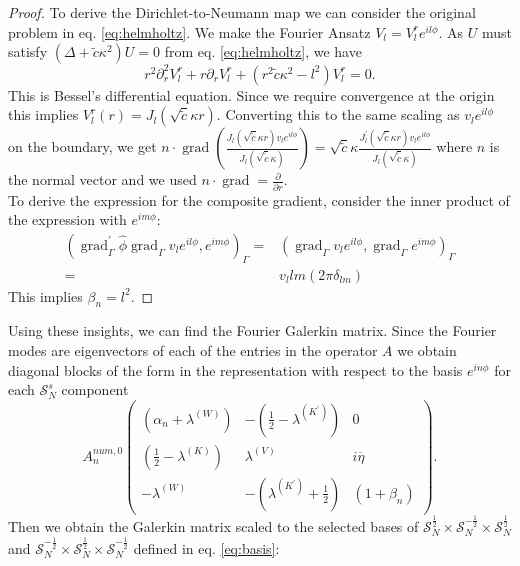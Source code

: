 \documentclass[12pt,journal,compsoc, onecolumn]{IEEEtran}
\begin{document}
\begin{proof}
    To derive the Dirichlet-to-Neumann map we can consider the original problem in eq. \ref{eq:helmholtz}. 
    We make the Fourier Ansatz $V_l = V^r_l e^{i l \phi}$. As $U$ must satisfy  $(\Delta + \tilde c\kappa^2) U = 0$ from eq. \ref{eq:helmholtz}, 
we have 
$$
r^2 \partial_r^2V_l^r + r \partial_r V_l^r + (r^2  \tilde c \kappa^2 - l^2)V^r_l = 0.
$$
This is Bessel's differential equation. Since we require convergence at the origin this implies $V^r_l(r) = J_l(\sqrt{\tilde c}\kappa r)$. Converting this to the same scaling as $v_le^{il\phi}$ on the boundary, we get $n\cdot \operatorname{grad} \left(\frac{J_l(\sqrt{\tilde c}\kappa r) v_l e^{i l \phi}}{J_l(\sqrt{\tilde c}\kappa)}\right) = \sqrt{\tilde c}\kappa \frac{J_l^\prime(\sqrt{\tilde c}\kappa r) v_l e^{i l \phi}}{J_l(\sqrt{\tilde c}\kappa)}$  where $n$ is the normal vector and we used $n\cdot \operatorname{grad} = \frac{\partial}{\partial r}$. \\
To derive the expression for the composite gradient, consider the inner product of the expression with $e^{im\phi}$: 
\begin{align}
    (\operatorname{grad}_{\Gamma}^{\prime} \hat{\phi} \operatorname{grad}_{\Gamma} v_l e^{il\phi}, e^{im\phi})_\Gamma =&  (  \operatorname{grad}_{\Gamma} v_l e^{il\phi}, \operatorname{grad}_{\Gamma}e^{im\phi})_\Gamma \nonumber \\ =& v_l lm (2\pi \delta_{lm}) \nonumber
\end{align}
This implies $\beta_n = l^2$.
\end{proof}  \noindent
Using these insights, we can find the Fourier Galerkin matrix. 
Since the Fourier modes are eigenvectors of each of the entries in the operator $A$ we obtain diagonal blocks of the form in the representation with respect to the basis $e^{i n \phi}$ for each $\mathcal{S}_N^{s}$ component
$$
A^{num, 0}_n
\begin{pmatrix}
    (\alpha_n + \lambda^{(W)}) & - (\frac{1}{2} - \lambda^{(K^\prime)}) & 0 \\
    (\frac{1}{2} -  \lambda^{(K)}) &  \lambda^{(V)} & i \overline{\eta} \\ 
    -  \lambda^{(W)} & - ( \lambda^{(K^\prime)} + \frac{1}{2}) & (1 + \beta_n)
\end{pmatrix}.
$$
Then we obtain the Galerkin matrix scaled to the selected bases of $\mathcal{S}_N^{\frac{1}{2}}\times \mathcal{S}_N^{-\frac{1}{2}}\times \mathcal{S}_N^{\frac{1}{2}}$ and $\mathcal{S}_N^{-\frac{1}{2}}\times \mathcal{S}_N^{\frac{1}{2}}\times \mathcal{S}_N^{-\frac{1}{2}}$ defined in eq. \ref{eq:basis}: 
\end{document}
